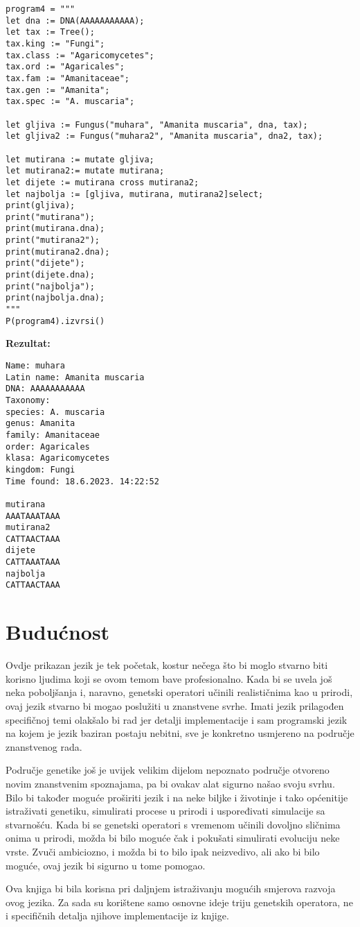 \documentclass{article}
\begin{document}
\begin{lstlisting}
program4 = """
let dna := DNA(AAAAAAAAAAA);
let tax := Tree();
tax.king := "Fungi";
tax.class := "Agaricomycetes";
tax.ord := "Agaricales";
tax.fam := "Amanitaceae";
tax.gen := "Amanita";
tax.spec := "A. muscaria";

let gljiva := Fungus("muhara", "Amanita muscaria", dna, tax);
let gljiva2 := Fungus("muhara2", "Amanita muscaria", dna2, tax);

let mutirana := mutate gljiva;
let mutirana2:= mutate mutirana;
let dijete := mutirana cross mutirana2;
let najbolja := [gljiva, mutirana, mutirana2]select;
print(gljiva);
print("mutirana");
print(mutirana.dna);
print("mutirana2");
print(mutirana2.dna);
print("dijete");
print(dijete.dna);
print("najbolja");
print(najbolja.dna);
"""
P(program4).izvrsi()
\end{lstlisting}
\textbf{Rezultat:}
\begin{lstlisting}
Name: muhara
Latin name: Amanita muscaria
DNA: AAAAAAAAAAA
Taxonomy: 
species: A. muscaria
genus: Amanita
family: Amanitaceae
order: Agaricales
klasa: Agaricomycetes
kingdom: Fungi
Time found: 18.6.2023. 14:22:52

mutirana
AAATAAATAAA
mutirana2
CATTAACTAAA
dijete
CATTAAATAAA
najbolja
CATTAACTAAA
\end{lstlisting}
\section{Budućnost}
Ovdje prikazan jezik je tek početak, kostur nečega što bi moglo stvarno biti korisno ljudima koji se ovom
temom bave profesionalno. Kada bi se uvela još neka poboljšanja i, naravno, genetski operatori učinili
realističnima kao u prirodi, ovaj jezik stvarno bi mogao poslužiti u znanstvene svrhe. Imati jezik
prilagođen specifičnoj temi olakšalo bi rad jer detalji implementacije i sam programski jezik na kojem je
jezik baziran postaju nebitni, sve je konkretno usmjereno na područje znanstvenog rada.


Područje genetike još je uvijek velikim dijelom nepoznato područje otvoreno novim znanstvenim spoznajama,
pa bi ovakav alat sigurno našao svoju svrhu. Bilo bi također moguće proširiti jezik i na neke biljke i
životinje i tako općenitije istraživati genetiku, simulirati procese u prirodi i uspoređivati simulacije sa
stvarnošću. Kada bi se genetski operatori s vremenom učinili dovoljno sličnima onima u prirodi, možda bi
bilo moguće čak i pokušati simulirati evoluciju neke vrste. Zvuči ambiciozno, i možda bi to bilo
ipak neizvedivo, ali ako bi bilo moguće, ovaj jezik bi sigurno u tome pomogao.\nocite{*}

\printbibliography
Ova knjiga bi bila korisna pri daljnjem istraživanju mogućih smjerova razvoja ovog jezika. Za sada su korištene samo osnovne ideje triju
genetskih operatora, ne i specifičnih detalja njihove implementacije iz knjige.
\end{document}
